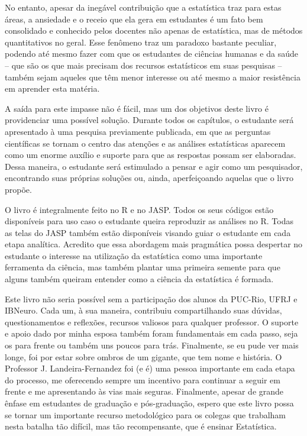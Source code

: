 \documentclass[
]{book}
\begin{document}
No entanto, apesar da inegável contribuição que a estatística traz para estas áreas, a ansiedade e o receio que ela gera em estudantes é um fato bem consolidado e conhecido pelos docentes não apenas de estatística, mas de métodos quantitativos no geral. Esse fenômeno traz um paradoxo bastante peculiar, podendo até mesmo fazer com que os estudantes de ciências humanas e da saúde -- que são os que mais precisam dos recursos estatísticos em suas pesquisas -- também sejam aqueles que têm menor interesse ou até mesmo a maior resistência em aprender esta matéria.

A saída para este impasse não é fácil, mas um dos objetivos deste livro é providenciar uma possível solução. Durante todos os capítulos, o estudante será apresentado à uma pesquisa previamente publicada, em que as perguntas científicas se tornam o centro das atenções e as análises estatísticas aparecem como um enorme auxílio e suporte para que as respostas possam ser elaboradas. Dessa maneira, o estudante será estimulado a pensar e agir como um pesquisador, encontrando suas próprias soluções ou, ainda, aperfeiçoando aquelas que o livro propõe.

O livro é integralmente feito no R e no JASP. Todos os seus códigos estão disponíveis para uso caso o estudante queira reproduzir as análises no R. Todas as telas do JASP também estão disponíveis visando guiar o estudante em cada etapa analítica. Acredito que essa abordagem mais pragmática possa despertar no estudante o interesse na utilização da estatística como uma importante ferramenta da ciência, mas também plantar uma primeira semente para que alguns também queiram entender como a ciência da estatística é formada.

Este livro não seria possível sem a participação dos alunos da PUC-Rio, UFRJ e IBNeuro. Cada um, à sua maneira, contribuiu compartilhando suas dúvidas, questionamentos e reflexões, recursos valiosos para qualquer professor. O suporte e apoio dado por minha esposa também foram fundamentais em cada passo, seja os para frente ou também uns poucos para trás. Finalmente, se eu pude ver mais longe, foi por estar sobre ombros de um gigante, que tem nome e história. O Professor J. Landeira-Fernandez foi (e é) uma pessoa importante em cada etapa do processo, me oferecendo sempre um incentivo para continuar a seguir em frente e me apresentando às vias mais seguras.
Finalmente, apesar de grande ênfase em estudantes de graduação e pós-graduação, espero que este livro possa se tornar um importante recurso metodológico para os colegas que trabalham nesta batalha tão difícil, mas tão recompensante, que é ensinar Estatística.
\end{document}
